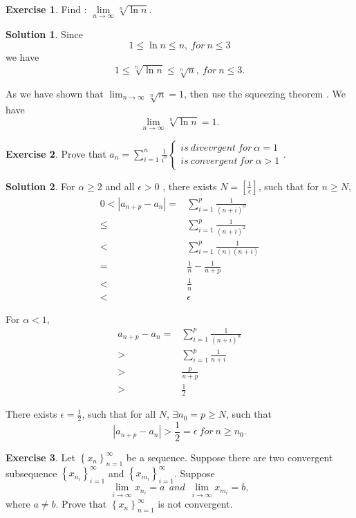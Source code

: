 \documentclass{article}
\theoremstyle{definition}
\newtheorem{exe}{Exercise}[section]
\newtheorem{sol}{Solution}[exe]
\begin{document}
\begin{exe}
    Find : $\underset{n \to \infty}{\lim}\sqrt[n]{\ln n}.$
\end{exe}

\begin{sol}
Since $$1\leq \ln n\leq n,\ for\ n\leq 3$$
we have $$1\leq \sqrt[n]{\ln n}\leq \sqrt[n]{n},\ for\ n\leq 3.$$

As we have shown that $\lim_{n\to \infty}\sqrt[n]{n}=1$, then use the squeezing theorem . We have $$\underset{n \to \infty}{\lim}\sqrt[n]{\ln n}=1.$$

\end{sol}

\begin{exe}
    Prove that $a_{n}=\sum_{i=1}^{n}\frac{1}{i^{\alpha}}
    \begin{cases}
    is\ divevrgent\ for\ \alpha=1\\
    is\ convergent\ for\ \alpha>1
    \end{cases}.$
\end{exe}


\begin{sol}

For $\alpha\geq 2$ and all $\epsilon>0$ , there exists $N=[\frac{1}{\epsilon}]$, such that for $n\geq N$, 
\begin{align*}
    0<|a_{n+p}-a_{n}|=& \sum_{i=1}^{p}\frac{1}{(n+i)^{\alpha}}\\
    \leq& \sum_{i=1}^{p}\frac{1}{(n+i)^{2}}\\
    <& \sum_{i=1}^{p}\frac{1}{(n)(n+i)}\\
    =& \frac{1}{n}-\frac{1}{n+p}\\
    <& \frac{1}{n}\\
    <& \epsilon
\end{align*}

For $\alpha<1$, 
\begin{align*}
    a_{n+p}-a_{n}=& \sum_{i=1}^{p}\frac{1}{(n+i)^{\alpha}}\\
    >& \sum_{i=1}^{p}\frac{1}{n+i}\\
    >& \frac{p}{n+p}\\
    >& \frac{1}{2}
\end{align*}

There exists $\epsilon=\frac{1}{2}$, such that for all $N$, $\exists n_{0}=p\geq N$, such that
$$|a_{n+p}-a_{n}|>\frac{1}{2}=\epsilon\ for\ n\geq n_{0}.$$
\end{sol}

\begin{exe}
    Let $\left\{x_{n}\right\}_{n=1}^{\infty}$ be a sequence. Suppose there are two convergent subsequence $\left\{x_{n_{i}}\right\}_{i=1}^{\infty}$ and
    $\left\{x_{m_{i}}\right\}_{i=1}^{\infty}$. Suppose 
    $$\lim_{i\to \infty}x_{n_{i}}=a\ \ and\ \ \lim_{i\to \infty}x_{m_{i}}=b,$$
    where $a\neq b$. Prove that $\left\{x_{n}\right\}_{n=1}^{\infty}$ is not convergent.
\end{exe}
\end{document}
